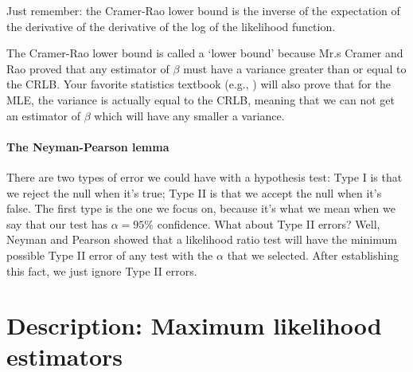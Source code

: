 Just remember: the Cramer-Rao lower bound is the inverse of the expectation of the
derivative of the derivative of the log of the likelihood function.

The Cramer-Rao lower bound is
called a `lower bound' because Mr.s Cramer and Rao proved that any
estimator of $\beta$ must have a variance greater than or equal to the
CRLB. Your favorite statistics textbook (e.g., \cite{casella:berger})
will also prove that for the MLE, the variance is actually equal to the
CRLB, meaning that we can not get an estimator of $\beta$ which will
have any smaller a variance.

\paragraph{The Neyman-Pearson lemma} There are two types of error we could
have with a hypothesis test: Type I is that we reject the null when it's
true; Type II is that we accept the null when it's false. The first type
is the one we focus on, because it's what we mean when we say that our
test has $\alpha=95\%$ confidence. What about Type II errors? Well, Neyman
and Pearson showed that a likelihood ratio test will have the minimum
possible Type II error of any test with the $\alpha$ that we selected. After establishing this fact, we
just ignore Type II errors.

\section{Description: Maximum likelihood estimators} 




